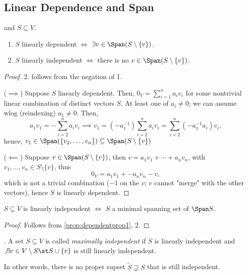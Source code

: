 \subsection{Linear Dependence and Span}

\begin{proposition}\label{prop:dependentprop1}
     and $S \subseteq V$.
    \begin{enumerate}
        \item $S$ linearly dependent $\iff$ $\exists v \in \Span (S \setminus \{v\})$.
        \item $S$ linearly independent $\iff$ there is no $v \in \Span (S \setminus \{v\})$.
    \end{enumerate} 
\end{proposition}

\begin{proof}
    2. follows from the negation of 1.

    \noindent($\implies$) Suppose $S$ linearly dependent. Then, $0_V = \sum_{i=1}^n a_i v_i$ for some nontrivial linear combination of distinct vectors $S$. At least one of $a_i \neq 0$; we can assume wlog (reindexing) $a_1 \neq 0$. Then, 
    \[
    a_1 v_1 = -\sum_{i=2}^n a_i v_i \implies v_1 = (-a_1^{-1}) \sum_{i=2}^n a_iv_i = \sum_{i=2}^{n} (-a_1^{-1}a_i)v_i,
    \]
    hence, $v_1 \in \Span (\{v_2, \dots, v_n\}) \subseteq \Span (S \setminus \{v \})$

    \noindent ($\impliedby$) Suppose $v \in \Span (S \setminus \{v\})$, then $v = a_1 v_1 + \cdots + a_n v_n$, with $v_1, \dots, v_n \in S \setminus \{v\}$, thus \[
    0_V = a_1 v_1 + \cdots a_n v_n - v,    
    \]
    which is not a trivial combination ($-1$ on the $v$; $v$ cannot "merge" with the other vectors), hence $S$ is linearly dependent.
\end{proof}

\begin{corollary}\label{cor:minspanninglin}
    $S \subseteq V$ is linearly independent $\iff$ $S$ a minimal spanning set of $\Span S$.
\end{corollary}

\begin{proof}
    Follows from \cref{prop:dependentprop1}, 2.
\end{proof}

\begin{definition}
     . A set $S \subseteq V$ is called \emph{maximally independent} if $S$ is linearly independent and $\not \exists v \in V \setminus S \st S \cup \{v\}$ is still linearly independent.
    
    In other words, there is no proper supset $\tilde{S} \supsetneq S$ that is still independent.
\end{definition}

